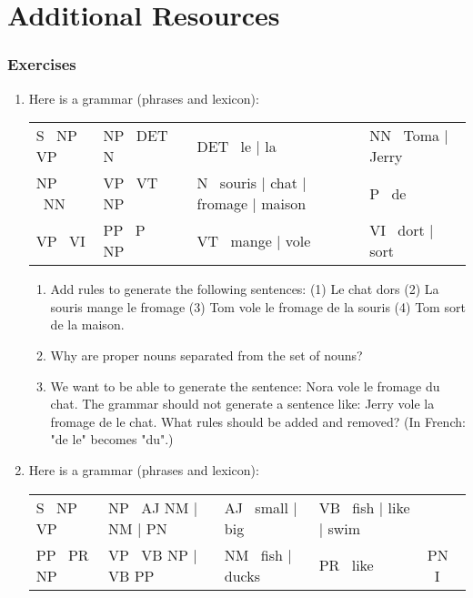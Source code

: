 \documentclass{KodeBook}
\begin{document}
\section{Additional Resources}

\subsubsection*{Exercises}

\begin{enumerate}
	\item Here is a grammar (phrases and lexicon):
	
	\begin{tabular}{|lllll|}
		\hline
		S \textrightarrow\ NP VP & NP \textrightarrow\ DET N && DET \textrightarrow\ le | la & NN \textrightarrow\ Toma | Jerry \\
		NP \textrightarrow\ NN & VP \textrightarrow\ VT NP &&  N \textrightarrow\  souris | chat | fromage | maison & P \textrightarrow\ de\\
		VP \textrightarrow\ VI & PP \textrightarrow\ P NP && VT \textrightarrow\ mange | vole & VI \textrightarrow\ dort | sort\\
		\hline
	\end{tabular}
	
	\begin{enumerate}
		\item Add rules to generate the following sentences: (1) Le chat dors (2) La souris mange le fromage (3) Tom vole le fromage de la souris (4) Tom sort de la maison.
		\item Why are proper nouns separated from the set of nouns?
		\item We want to be able to generate the sentence: Nora vole le fromage du chat. The grammar should not generate a sentence like: Jerry vole la fromage de le chat. What rules should be added and removed? (In French: "de le" becomes "du".)
	\end{enumerate}
	
	\item Here is a grammar (phrases and lexicon):
	
	\begin{tabular}{|lllll|}
		\hline
		S \textrightarrow\ NP VP & NP \textrightarrow\ AJ NM | NM | PN & AJ \textrightarrow\ small | big  & VB \textrightarrow\ fish | like | swim &  \\
		PP \textrightarrow\ PR NP & VP \textrightarrow\ VB NP | VB PP & NM \textrightarrow\ fish | ducks & PR \textrightarrow\ like & PN \textrightarrow\ I \\
		\hline
	\end{tabular}
	

\end{enumerate}
\end{document}
